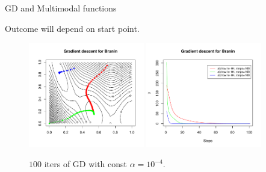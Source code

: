\documentclass[11pt,compress,t,notes=noshow, xcolor=table]{beamer}
\begin{document}
\begin{vbframe}{GD and Multimodal functions}

Outcome will depend on start point. 

\begin{figure}
	\includegraphics[width=0.45\textwidth]{figure_man/gradient_descent_branin.pdf} \includegraphics[width=0.45\textwidth]{figure_man/gradient_descent_branin2.pdf}\\
	\vspace*{-0.3cm}
	\begin{footnotesize}
		$100$ iters of GD with const $\alpha = 10^{-4}$.
	\end{footnotesize}
\end{figure}

\end{vbframe}

\end{document}
